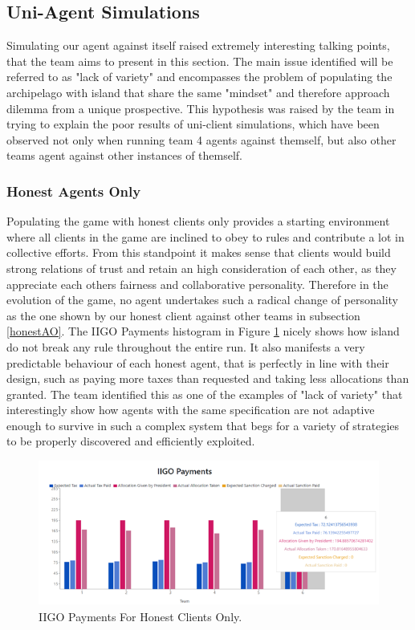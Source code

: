 \subsection{Uni-Agent Simulations} \label{againstself}
Simulating our agent against itself raised extremely interesting talking points, that the team aims to present in this section. The main issue identified will be referred to as "lack of variety" and encompasses the problem of populating the archipelago with island that share the same "mindset" and therefore approach dilemma from a unique prospective. This hypothesis was raised by the team in trying to explain the poor results of uni-client simulations, which have been observed not only when running team 4 agents against themself, but also other teams agent against other instances of themself.

\subsubsection{Honest Agents Only}
Populating the game with honest clients only provides a starting environment where all clients in the game are inclined to obey to rules and contribute a lot in collective efforts. From this standpoint it makes sense that clients would build strong relations of trust and retain an high consideration of each other, as they appreciate each others fairness and collaborative personality. Therefore in the evolution of the game, no agent undertakes such a radical change of personality as the one shown by our honest client against other teams in subsection \ref{honestAO}. The IIGO Payments histogram in Figure \ref{fig:IIGOHH} nicely shows how island do not break any rule throughout the entire run. It also manifests a very predictable behaviour of each honest agent, that is perfectly in line with their design, such as paying more taxes than requested and taking less allocations than granted. The team identified this as one of the examples of "lack of variety" that interestingly show how agents with the same specification are not adaptive enough to survive in such a complex system that begs for a variety of strategies to be properly discovered and efficiently exploited. 
\begin{figure}[H]
\centering
\includegraphics[scale=0.8]{12_team4_agentdesign/images/IIGOHH.png}
\caption{IIGO Payments For Honest Clients Only.}
\label{fig:IIGOHH}
\end{figure}
